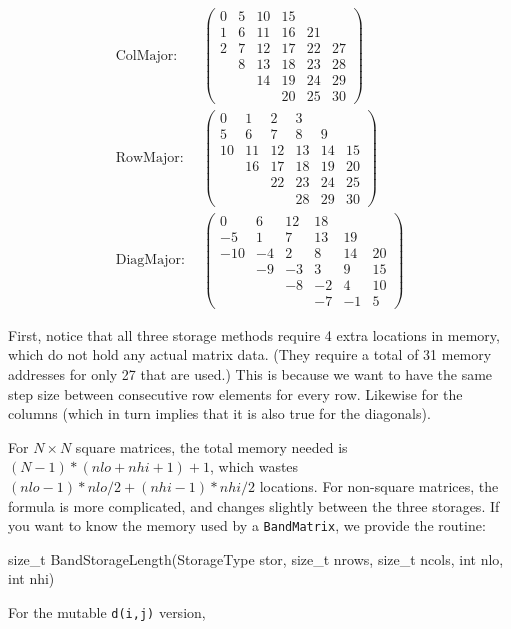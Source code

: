 \documentclass[twoside,letterpaper,11pt]{article}
\renewcommand{\tt}[1]{{\lstinline {#1}}}
\begin{document}
\begin{align*}
\textrm{ColMajor:} ~ ~ & \left(\begin{array}{cccccc}0 & 5 & 10 & 15 &  &  \\1 & 6 & 11 & 16 & 21 &  \\2 & 7 & 12 & 17 & 22 & 27 \\ & 8 & 13 & 18 & 23 & 28 \\ &  & 14 & 19 & 24 & 29 \\ &  &  & 20 & 25 & 30\end{array}\right) \\
\textrm{RowMajor:} ~  ~ & \left(\begin{array}{cccccc}0 & 1 & 2 & 3 &  &  \\ 5 & 6 & 7 & 8 & 9 &  \\ 10 & 11 & 12 & 13 & 14 & 15 \\ & 16 & 17 & 18 & 19 & 20 \\ &  & 22 & 23 & 24 & 25 \\ &  &  & 28 & 29 & 30\end{array}\right) \\
\textrm{DiagMajor:} ~  ~ & \left(\begin{array}{cccccc}0 & 6 & 12 & 18 &  &  \\-5 & 1 & 7 & 13 & 19 &  \\ -10 & -4 & 2 & 8 & 14 & 20 \\ & -9 & -3 & 3 & 9 & 15 \\ &  & -8 & -2 & 4 & 10 \\ &  &  & -7 & -1 & 5\end{array}\right)
\end{align*}

First, notice that all three storage methods require 4 extra locations in memory, 
which do not hold
any actual matrix data.  
(They require a total of 31 memory addresses for only 27 that are used.)
This is because we want to have the same step size between consecutive row elements
for every row.  Likewise for the columns (which in turn implies that it is also 
true for the diagonals).

For $N\times N$ square matrices, the total memory needed is $(N-1)*(nlo+nhi+1)+1$, 
which wastes $(nlo-1)*nlo/2 + (nhi-1)*nhi/2$ locations.  For non-square
matrices, the formula is more complicated, and changes slightly between the 
three storages.
If you want to know the memory used by a \tt{BandMatrix}, we provide the routine:
\begin{tmvcode}
size_t BandStorageLength(StorageType stor, size_t nrows, size_t ncols, 
        int nlo, int nhi)
\end{tmvcode}
For the mutable \tt{d(i,j)} version, 
\label{bandmatrixstoragesize}
  
\end{document}
